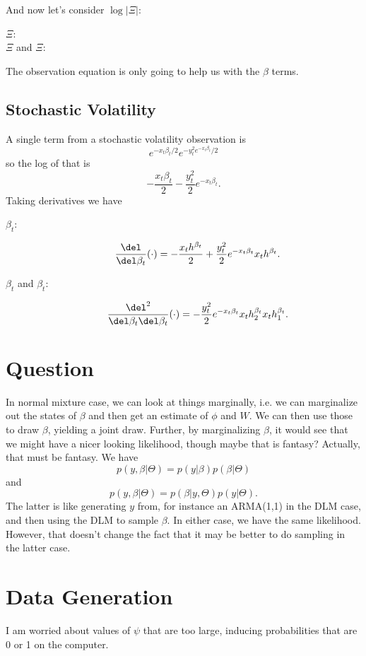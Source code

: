 \documentclass{article}
\begin{document}
And now let's consider $\log |\Xi|$:
\begin{description}

\item[$\Xi$:]

\item[$\Xi$ and $\Xi$:]

\end{description}

The observation equation is only going to help us with the $\beta$ terms.

\subsection{Stochastic Volatility}

A single term from a stochastic volatility observation is
\[
e^{-x_t \beta_t/2} e^{-y_t^2 e^{-x_t \beta_t} / 2}
\]
so the log of that is
\[
- \frac{x_t \beta_t}{2} - \frac{y_t^2}{2} e^{-x_t \beta_t}.
\]
Taking derivatives we have
\begin{description}

\item[$\beta_t$:] \hfill
\[
\frac{\del}{\del \beta_{t}}(\cdot) = - \frac{x_t h^{\beta_t}}{2} 
+ \frac{y_t^2}{2} e^{-x_t \beta_t} x_t h^{\beta_t}.
\]

\item[$\beta_t$ and $\beta_t$:]
\[
\frac{\del^2}{\del \beta_t \del \beta_{t}}(\cdot) = 
-\frac{y_t^2}{2} e^{-x_t \beta_t} x_t h^{\beta_t}_2 x_t h^{\beta_t}_1.
\]

\end{description}

\section{Question}

In normal mixture case, we can look at things marginally, i.e. we can
marginalize out the states of $\beta$ and then get an estimate of $\phi$ and
$W$.  We can then use those to draw $\beta$, yielding a joint draw.  Further, by
marginalizing $\beta$, it would see that we might have a nicer looking
likelihood, though maybe that is fantasy?  Actually, that must be fantasy.  We
have
\[
p(y, \beta | \Theta) = p(y | \beta) p(\beta | \Theta)
\]
and
\[
p(y, \beta | \Theta) = p(\beta | y, \Theta) p(y | \Theta).
\]
The latter is like generating $y$ from, for instance an ARMA(1,1) in the DLM
case, and then using the DLM to sample $\beta$.  In either case, we have the
same likelihood.  However, that doesn't change the fact that it may be better to
do sampling in the latter case.

\section{Data Generation}

I am worried about values of $\psi$ that are too large, inducing probabilities
that are 0 or 1 on the computer.

{}

\end{document}
